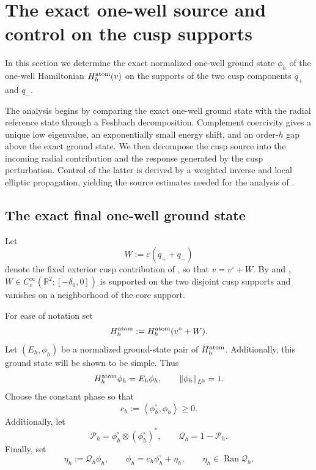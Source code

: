 \documentclass[11pt]{article}
\newcommand{\R}{\mathbb R}
\newcommand{\eps}{\varepsilon}
\newcommand{\cP}{\mathcal P}
\newcommand{\cQ}{\mathcal Q}
\newcommand{\norm}[1]{\left\|#1\right\|}
\newcommand{\ip}[2]{\left\langle #1,#2\right\rangle}
\newcommand{\Ran}{\operatorname{Ran}}
\begin{document}
\section{The exact one-well source and control on the cusp supports}\label{sec:one-well-source}

In this section we determine the exact normalized one-well ground state $\phi_h$ of the one-well Hamiltonian $H_h^{\rm atom}(v)$
on the supports of the two cusp components $q_+$ and $q_-$.  

The analysis begins by comparing the exact one-well ground state with the radial reference state through a Feshbach decomposition. Complement coercivity gives a unique low eigenvalue, an exponentially small energy shift, and an order-$h$ gap above the exact ground state. We then decompose the cusp source into the incoming radial contribution and the response generated by the cusp perturbation. Control of the latter is derived by a weighted inverse and local elliptic propagation, yielding the source estimates needed for the analysis of .

\subsection{The exact final one-well ground state}\label{sec:one-well-feshbach}
Let 
\[
W:=\eps(q_++q_-)
\]
denote the fixed exterior cusp contribution of , so that $v=v^\circ+W$. By
 and , $W\in C_c^\infty(\R^2;[-\delta_0,0])$
is supported on the two disjoint cusp supports and vanishes on a neighborhood of the
core support.  

For ease of notation set
\[
 H_h^{\rm atom}:=H_h^{\rm atom}(v^\circ+W).
\]
Let $(E_h,\phi_h)$ be a normalized ground-state pair of $H_h^{\rm atom}$. Additionally, this ground state will be shown to be simple. Thus
\begin{equation}\label{eq:final-operator}
 H_h^{\rm atom}\phi_h=E_h\phi_h,
 \qquad \norm{\phi_h}_{L^2}=1.
\end{equation}
Choose the constant phase so that
\begin{equation}\label{eq:positive-overlap}
 c_h:=\ip{\phi_h^\circ}{\phi_h}\geq0.
\end{equation}
Additionally, let
\begin{equation}\label{eq:PQ}
 \cP_h=\phi_h^\circ\otimes(\phi_h^\circ)^*,
 \qquad \cQ_h=1-\cP_h.
\end{equation}
Finally, set
\begin{equation}\label{eq:phi-decomp}
 \eta_h:=\cQ_h\phi_h,
 \qquad
 \phi_h=c_h\phi_h^\circ+\eta_h,
 \qquad \eta_h\in\Ran\cQ_h.
\end{equation}
\end{document}

